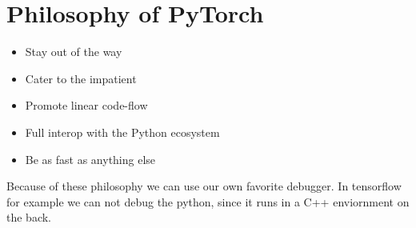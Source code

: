 \documentclass[11pt,twoside,a4paper]{report}
\begin{document}
\section{Philosophy of PyTorch}

\begin{itemize}
    \item Stay out of the way
    \item Cater to the impatient
    \item Promote linear code-flow
    \item Full interop with the Python ecosystem
    \item Be as fast as anything else
\end{itemize}

Because of these philosophy we can use our own favorite debugger. In tensorflow for example we can not debug the python, since it runs in a C++ enviornment on the back.
\end{document}
